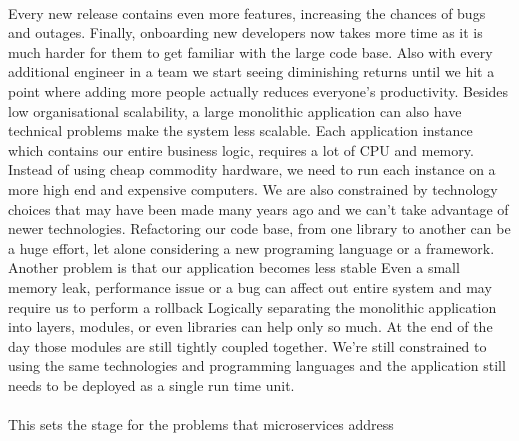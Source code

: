 \paragraph{}
Every new release contains even more features, increasing the chances of bugs and outages.
Finally, onboarding new developers now takes more time as it is much harder for them to get familiar with the large code base.
Also with every additional engineer in a team we start seeing diminishing returns until we hit a point where adding more people actually reduces everyone's productivity.
Besides low organisational scalability, a large monolithic application can also have technical problems make the system less scalable.
Each application instance which contains our entire business logic, requires a lot of CPU and memory.
Instead of using cheap commodity hardware, we need to run each instance on a more high end and expensive computers.
We are also constrained by technology choices that may have been made many years ago and we can't take advantage of newer technologies.
Refactoring our code base, from one library to another can be a huge effort, let alone considering a new programing language or a framework.
Another problem is that our application becomes less stable
Even a small memory leak, performance issue or a bug can affect out entire system and may require us to perform a rollback
Logically separating the monolithic application into layers, modules, or even libraries can help only so much.
At the end of the day those modules are still tightly coupled together.
We're still constrained to using the same technologies and programming languages and the application still needs to be deployed as a single run time unit.

\paragraph{}
This sets the stage for the problems that microservices address

